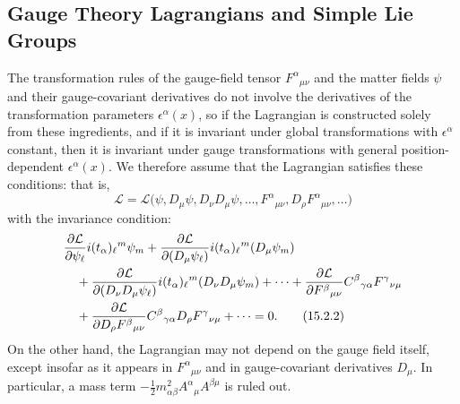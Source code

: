 
\subsection{Gauge Theory Lagrangians and Simple Lie Groups}
\label{sec:15.2}

The transformation rules of the gauge-field tensor $F^\alpha{}_{\mu\nu}$ and
the matter fields $\psi$ and their gauge-covariant derivatives do not involve the
derivatives of the transformation parameters $\epsilon^\alpha(x)$, so if the
Lagrangian is constructed solely from these ingredients, and if it is invariant
under global transformations with $\epsilon^\alpha$ constant, then it is invariant
under gauge transformations with general position-dependent $\epsilon^\alpha(x)$.
We therefore assume that the Lagrangian satisfies these conditions: that is,
\begin{equation}
 \mathcal L=\mathcal L\bigl(\psi,D_\mu\psi,D_\nu D_\mu\psi,\ldots,
 F^\alpha{}_{\mu\nu},D_\rho F^\alpha{}_{\mu\nu},\ldots\bigr)
 \tag{15.2.1}\label{eq:15.2.1}
\end{equation}
with the invariance condition:
\begin{align}
 &\frac{\partial\mathcal L}{\partial\psi_\ell}
 i(t_\alpha)_\ell{}^m\psi_m
 +\frac{\partial\mathcal L}{\partial(D_\mu\psi_\ell)}
 i(t_\alpha)_\ell{}^m(D_\mu\psi_m)\notag\\
 &\quad
 +\frac{\partial\mathcal L}{\partial(D_\nu D_\mu\psi_\ell)}
 i(t_\alpha)_\ell{}^m(D_\nu D_\mu\psi_m)+\cdots
 +\frac{\partial\mathcal L}{\partial F^\beta{}_{\mu\nu}}
 C^\beta{}_{\gamma\alpha}F^\gamma{}_{\nu\mu}\notag\\
 &\quad
 +\frac{\partial\mathcal L}{\partial D_\rho F^\beta{}_{\mu\nu}}
 C^\beta{}_{\gamma\alpha}D_\rho F^\gamma{}_{\nu\mu}+\cdots=0 .
 \tag{15.2.2}\label{eq:15.2.2}
\end{align}
On the other hand, the Lagrangian may not depend on the gauge field itself,
except insofar as it appears in $F^\alpha{}_{\mu\nu}$ and in gauge-covariant
derivatives $D_\mu$. In particular, a mass term
$-\frac12m^2_{\alpha\beta}A^\alpha{}_\mu A^{\beta\mu}$ is ruled out.

